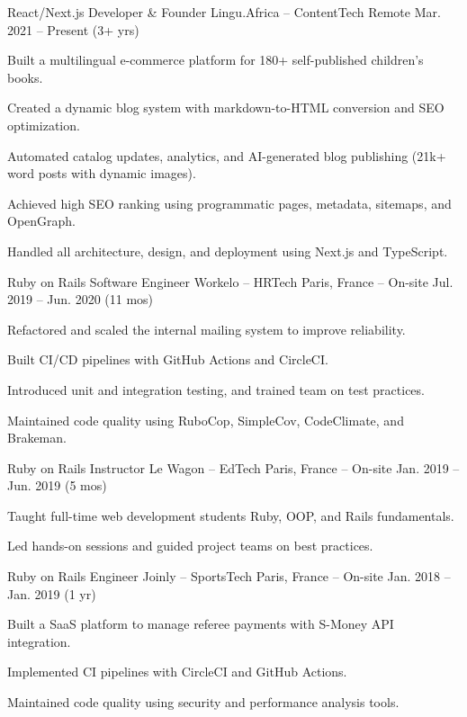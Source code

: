 \begin{cventries}
\cventry
  {React/Next.js Developer \& Founder}
  {Lingu.Africa – ContentTech}
  {Remote}
  {Mar. 2021 – Present (3+ yrs)}
  {
    \begin{cvitems}
      \item {Built a multilingual e-commerce platform for 180+ self-published children's books.}
      \item {Created a dynamic blog system with markdown-to-HTML conversion and SEO optimization.}
      \item {Automated catalog updates, analytics, and AI-generated blog publishing (21k+ word posts with dynamic images).}
      \item {Achieved high SEO ranking using programmatic pages, metadata, sitemaps, and OpenGraph.}
      \item {Handled all architecture, design, and deployment using Next.js and TypeScript.}
    \end{cvitems}
  }

\cventry
  {Ruby on Rails Software Engineer}
  {Workelo – HRTech}
  {Paris, France – On-site}
  {Jul. 2019 – Jun. 2020 (11 mos)}
  {
    \begin{cvitems}
      \item {Refactored and scaled the internal mailing system to improve reliability.}
      \item {Built CI/CD pipelines with GitHub Actions and CircleCI.}
      \item {Introduced unit and integration testing, and trained team on test practices.}
      \item {Maintained code quality using RuboCop, SimpleCov, CodeClimate, and Brakeman.}
    \end{cvitems}
  }

\cventry
  {Ruby on Rails Instructor}
  {Le Wagon – EdTech}
  {Paris, France – On-site}
  {Jan. 2019 – Jun. 2019 (5 mos)}
  {
    \begin{cvitems}
      \item {Taught full-time web development students Ruby, OOP, and Rails fundamentals.}
      \item {Led hands-on sessions and guided project teams on best practices.}
    \end{cvitems}
  }

\cventry
  {Ruby on Rails Engineer}
  {Joinly – SportsTech}
  {Paris, France – On-site}
  {Jan. 2018 – Jan. 2019 (1 yr)}
  {
    \begin{cvitems}
      \item {Built a SaaS platform to manage referee payments with S-Money API integration.}
      \item {Implemented CI pipelines with CircleCI and GitHub Actions.}
      \item {Maintained code quality using security and performance analysis tools.}
    \end{cvitems}
  }


\end{cventries}
